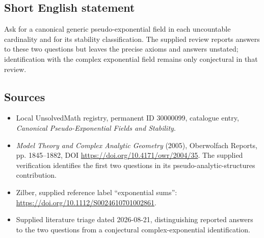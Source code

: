 \documentclass[11pt]{article}
\begin{document}
\subsection{Short English statement}
Ask for a canonical generic pseudo-exponential field in each uncountable cardinality and for its stability classification. The supplied review reports answers to these two questions but leaves the precise axioms and answers unstated; identification with the complex exponential field remains only conjectural in that review.
\subsection{Sources}
\begin{itemize}
\item Local UnsolvedMath registry, permanent ID 30000099, catalogue entry, \emph{Canonical Pseudo-Exponential Fields and Stability}.
\item \emph{Model Theory and Complex Analytic Geometry} (2005), Oberwolfach Reports, pp. 1845--1882, DOI \url{https://doi.org/10.4171/owr/2004/35}. The supplied verification identifies the first two questions in its pseudo-analytic-structures contribution.
\item Zilber, supplied reference label ``exponential sums'': \url{https://doi.org/10.1112/S0024610701002861}.
\item Supplied literature triage dated 2026-08-21, distinguishing reported answers to the two questions from a conjectural complex-exponential identification.
\end{itemize}
\end{document}
